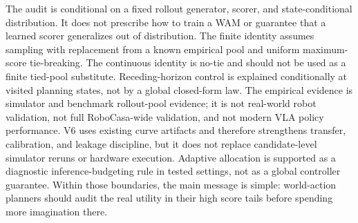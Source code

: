 \documentclass{article}
\begin{document}
The audit is conditional on a fixed rollout generator, scorer, and state-conditional distribution. It does not prescribe how to train a WAM or guarantee that a learned scorer generalizes out of distribution. The finite identity assumes sampling with replacement from a known empirical pool and uniform maximum-score tie-breaking. The continuous identity is no-tie and should not be used as a finite tied-pool substitute. Receding-horizon control is explained conditionally at visited planning states, not by a global closed-form law. The empirical evidence is simulator and benchmark rollout-pool evidence; it is not real-world robot validation, not full RoboCasa-wide validation, and not modern VLA policy performance. V6 uses existing curve artifacts and therefore strengthens transfer, calibration, and leakage discipline, but it does not replace candidate-level simulator reruns or hardware execution. Adaptive allocation is supported as a diagnostic inference-budgeting rule in tested settings, not as a global controller guarantee. Within those boundaries, the main message is simple: world-action planners should audit the real utility in their high score tails before spending more imagination there.




\clearpage
\appendix

\end{document}
